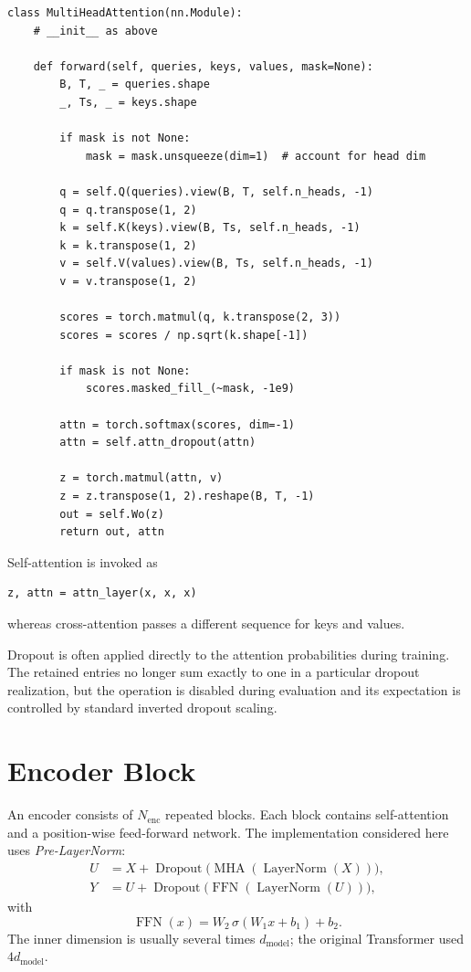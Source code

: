\documentclass[11pt]{article}
\newcommand{\LN}{\operatorname{LayerNorm}}
\newcommand{\MHA}{\operatorname{MHA}}
\newcommand{\FFN}{\operatorname{FFN}}
\newcommand{\Drop}{\operatorname{Dropout}}
\begin{document}
\begin{lstlisting}[caption={Forward pass of the multi-head attention layer.},label={lst:mha_forward}]
class MultiHeadAttention(nn.Module):
    # __init__ as above

    def forward(self, queries, keys, values, mask=None):
        B, T, _ = queries.shape
        _, Ts, _ = keys.shape

        if mask is not None:
            mask = mask.unsqueeze(dim=1)  # account for head dim

        q = self.Q(queries).view(B, T, self.n_heads, -1)
        q = q.transpose(1, 2)
        k = self.K(keys).view(B, Ts, self.n_heads, -1)
        k = k.transpose(1, 2)
        v = self.V(values).view(B, Ts, self.n_heads, -1)
        v = v.transpose(1, 2)

        scores = torch.matmul(q, k.transpose(2, 3))
        scores = scores / np.sqrt(k.shape[-1])

        if mask is not None:
            scores.masked_fill_(~mask, -1e9)

        attn = torch.softmax(scores, dim=-1)
        attn = self.attn_dropout(attn)

        z = torch.matmul(attn, v)
        z = z.transpose(1, 2).reshape(B, T, -1)
        out = self.Wo(z)
        return out, attn
\end{lstlisting}

Self-attention is invoked as
\begin{lstlisting}
z, attn = attn_layer(x, x, x)
\end{lstlisting}
whereas cross-attention passes a different sequence for keys and values.

Dropout is often applied directly to the attention probabilities during training. The retained entries no longer sum exactly to one in a particular dropout realization, but the operation is disabled during evaluation and its expectation is controlled by standard inverted dropout scaling.

\section{Encoder Block}
\label{sec:encoder}

An encoder consists of $N_{\mathrm{enc}}$ repeated blocks. Each block contains self-attention and a position-wise feed-forward network. The implementation considered here uses \emph{Pre-LayerNorm}:
\begin{align}
  U &= X + \Drop\bigl(\MHA(\LN(X))\bigr), \\
  Y &= U + \Drop\bigl(\FFN(\LN(U))\bigr),
\end{align}
with
\begin{equation}
  \FFN(x)=W_2\,\sigma(W_1x+b_1)+b_2.
\end{equation}
The inner dimension is usually several times $d_{\mathrm{model}}$; the original Transformer used $4d_{\mathrm{model}}$.
\end{document}
